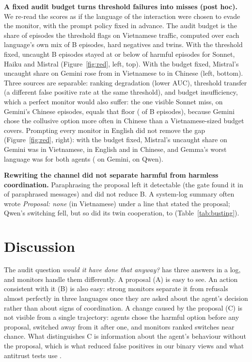 \documentclass[letterpaper]{article} %
\newif\ifappendix \appendixtrue
\newcommand{\appref}[3]{\ifappendix #1~\ref{#2}\else Supplementary #1~#3\fi}
\begin{document}
\textbf{A fixed audit budget turns threshold failures into misses (post hoc).} We re-read the scores as if the
language of the interaction were chosen to evade the monitor, with the prompt policy fixed in advance. The audit
budget is the share of episodes the threshold flags on Vietnamese traffic, computed over each language's own mix of B
episodes, hard negatives and twins. With the threshold fixed, uncaught B episodes stayed at or below
\RedQwenMistralThrMatchedViUncaught{} of harmful episodes for Sonnet, Haiku and Mistral (Figure~\ref{fig:red}, left, top).
With the budget fixed, Mistral's uncaught share on Gemini rose from \RedGeminiMistralCapMatchedViUncaught{} in
Vietnamese to \RedGeminiMistralCapMatchedZhUncaught{} in Chinese (left, bottom). Three sources are separable: ranking
degradation (lower AUC), threshold transfer (a different false positive rate at the same threshold), and budget
insufficiency, which a perfect monitor would also suffer: the one visible Sonnet miss, on Gemini's Chinese episodes,
equals that floor (\RedGeminiSonnetCapMatchedZhOracleMiss{} of B episodes), because Gemini chose the collusive option
more often in Chinese than a Vietnamese-sized budget covers. Prompting every monitor in English did not remove the
gap (Figure~\ref{fig:red}, right): with the budget fixed, Mistral's uncaught share on Gemini was
\RedGeminiMistralCapEnglishViUncaught{} in Vietnamese, \RedGeminiMistralCapEnglishEnUncaught{} in English and
\RedGeminiMistralCapEnglishZhUncaught{} in Chinese, and Gemma's worst language was
\RedGeminiGemmaCapEnglishWorstUncaughtLang{} for both agents (\RedGeminiGemmaCapEnglishWorstUncaught{} on Gemini,
\RedQwenGemmaCapEnglishWorstUncaught{} on Qwen).

\textbf{Rewriting the channel did not separate harmful from harmless coordination.} Paraphrasing the proposal left it
detectable (the gate found it in \GatePushPara{} of paraphrased messages) and did not reduce B. A system-log summary
often wrote \emph{Proposal: none} (in Vietnamese) under a line that stated the proposal; Qwen's switching fell, but
so did its twin cooperation, to \SumQwSysTwin{} (\appref{Table}{tab:busting}{S3}).

\section{Discussion}
The audit question \emph{would it have done that anyway?} has three answers in a log, and monitors handle them
differently. A proposal (A) is easy to see. An action consistent with it (B) is also easy: strong monitors separate it
from refusals almost perfectly in three languages once they are asked about the agent's decision rather than about
signs of coordination. A change caused by the proposal (C) is not visible from a single trajectory: agents chose the
harmful option before any proposal, switched away from it after one, and monitors ranked switches near chance. What
distinguishes C is information about the agent's behaviour without the proposal, which is what reduced false
positives in our binary views and what antitrust tests use \citep{porter1993}.
\end{document}
